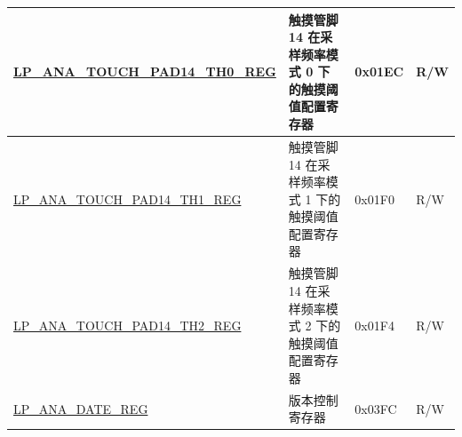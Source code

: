 \begin{longtable}{ | l| p{10cm} | p{1.3cm} | p{1cm} | }
\hyperref[regdesc:LPANATOUCHPAD0TH0REG]{LP\_ANA\_TOUCH\_PAD14\_TH0\_REG} & 触摸管脚 14 在采样频率模式 0 下的触摸阈值配置寄存器 & 0x01EC & R/W \\ \hline
\hyperref[regdesc:LPANATOUCHPAD0TH1REG]{LP\_ANA\_TOUCH\_PAD14\_TH1\_REG} & 触摸管脚 14 在采样频率模式 1 下的触摸阈值配置寄存器 & 0x01F0 & R/W \\ \hline
\hyperref[regdesc:LPANATOUCHPAD0TH2REG]{LP\_ANA\_TOUCH\_PAD14\_TH2\_REG} & 触摸管脚 14 在采样频率模式 2 下的触摸阈值配置寄存器 & 0x01F4 & R/W \\ \hline
\hyperref[regdesc:LPANADATEREG]{LP\_ANA\_DATE\_REG} & 版本控制寄存器 & 0x03FC & R/W \\ \hline
\end{longtable}

